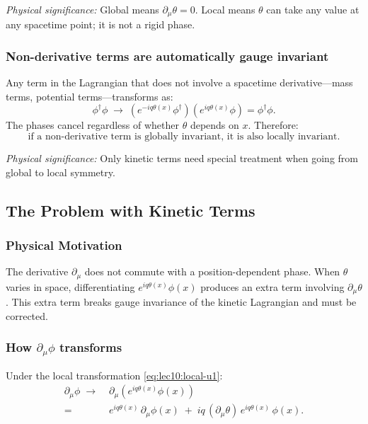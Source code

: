 \documentclass[../main.tex]{subfiles}
\begin{document}
\textit{Physical significance:} Global means $\partial_\mu\theta=0$.  Local means $\theta$ can take any value at any spacetime point; it is not a rigid phase.

\subsubsection*{Non-derivative terms are automatically gauge invariant}

Any term in the Lagrangian that does not involve a spacetime derivative—mass terms, potential terms—transforms as:
\begin{equation}
  \phi^\dagger\phi \;\longrightarrow\; (e^{-iq\theta(x)}\phi^\dagger)(e^{iq\theta(x)}\phi)
  = \phi^\dagger\phi.
  \label{eq:lec10:no-derivative-invariance}
\end{equation}
The phases cancel regardless of whether $\theta$ depends on $x$.  Therefore:
\begin{equation}
  \boxed{
  \text{if a non-derivative term is globally invariant, it is also locally invariant.}}
  \label{eq:lec10:nonderiv-always-invariant}
\end{equation}

\textit{Physical significance:} Only kinetic terms need special treatment when going from global to local symmetry.

\subsection*{The Problem with Kinetic Terms}

\subsubsection*{Physical Motivation}

The derivative $\partial_\mu$ does not commute with a position-dependent phase.  When $\theta$ varies in space, differentiating $e^{iq\theta(x)}\phi(x)$ produces an extra term involving $\partial_\mu\theta$.  This extra term breaks gauge invariance of the kinetic Lagrangian and must be corrected.

\subsubsection*{How $\partial_\mu\phi$ transforms}

Under the local transformation \eqref{eq:lec10:local-u1}:
\begin{align}
  \partial_\mu\phi \;\longrightarrow\;
  &\partial_\mu\!\left(e^{iq\theta(x)}\phi(x)\right) \nonumber \\
  ={}&
  e^{iq\theta(x)}\,\partial_\mu\phi(x)
  \;+\;
  iq\,(\partial_\mu\theta)\,e^{iq\theta(x)}\,\phi(x).
  \label{eq:lec10:derivative-transforms}
\end{align}
\end{document}
